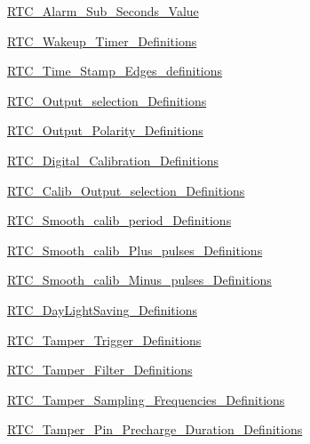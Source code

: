 \begin{DoxyCompactItemize}
\hyperlink{group___r_t_c___alarm___sub___seconds___value}{R\+T\+C\+\_\+\+Alarm\+\_\+\+Sub\+\_\+\+Seconds\+\_\+\+Value}
\item 
\hyperlink{group___r_t_c___wakeup___timer___definitions}{R\+T\+C\+\_\+\+Wakeup\+\_\+\+Timer\+\_\+\+Definitions}
\item 
\hyperlink{group___r_t_c___time___stamp___edges__definitions}{R\+T\+C\+\_\+\+Time\+\_\+\+Stamp\+\_\+\+Edges\+\_\+definitions}
\item 
\hyperlink{group___r_t_c___output__selection___definitions}{R\+T\+C\+\_\+\+Output\+\_\+selection\+\_\+\+Definitions}
\item 
\hyperlink{group___r_t_c___output___polarity___definitions}{R\+T\+C\+\_\+\+Output\+\_\+\+Polarity\+\_\+\+Definitions}
\item 
\hyperlink{group___r_t_c___digital___calibration___definitions}{R\+T\+C\+\_\+\+Digital\+\_\+\+Calibration\+\_\+\+Definitions}
\item 
\hyperlink{group___r_t_c___calib___output__selection___definitions}{R\+T\+C\+\_\+\+Calib\+\_\+\+Output\+\_\+selection\+\_\+\+Definitions}
\item 
\hyperlink{group___r_t_c___smooth__calib__period___definitions}{R\+T\+C\+\_\+\+Smooth\+\_\+calib\+\_\+period\+\_\+\+Definitions}
\item 
\hyperlink{group___r_t_c___smooth__calib___plus__pulses___definitions}{R\+T\+C\+\_\+\+Smooth\+\_\+calib\+\_\+\+Plus\+\_\+pulses\+\_\+\+Definitions}
\item 
\hyperlink{group___r_t_c___smooth__calib___minus__pulses___definitions}{R\+T\+C\+\_\+\+Smooth\+\_\+calib\+\_\+\+Minus\+\_\+pulses\+\_\+\+Definitions}
\item 
\hyperlink{group___r_t_c___day_light_saving___definitions}{R\+T\+C\+\_\+\+Day\+Light\+Saving\+\_\+\+Definitions}
\item 
\hyperlink{group___r_t_c___tamper___trigger___definitions}{R\+T\+C\+\_\+\+Tamper\+\_\+\+Trigger\+\_\+\+Definitions}
\item 
\hyperlink{group___r_t_c___tamper___filter___definitions}{R\+T\+C\+\_\+\+Tamper\+\_\+\+Filter\+\_\+\+Definitions}
\item 
\hyperlink{group___r_t_c___tamper___sampling___frequencies___definitions}{R\+T\+C\+\_\+\+Tamper\+\_\+\+Sampling\+\_\+\+Frequencies\+\_\+\+Definitions}
\item 
\hyperlink{group___r_t_c___tamper___pin___precharge___duration___definitions}{R\+T\+C\+\_\+\+Tamper\+\_\+\+Pin\+\_\+\+Precharge\+\_\+\+Duration\+\_\+\+Definitions}
\item 

\end{DoxyCompactItemize}
